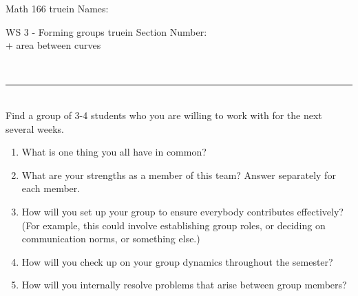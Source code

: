 \documentclass[12pt]{article}
\begin{document}
\pagestyle{empty} %

\noindent
{Math 166    truein  Names:\ \hrulefill}

\noindent
{WS 3 - Forming groups   truein  Section Number:\ \hrulefill\\ + area between curves}

\ 
\hrule\ \\
\noindent
\noindent
\noindent
Find a group of 3-4 students who you are willing to work with for the next several weeks.
\begin{enumerate}
\item What is one thing you all have in common?
\vfill
\item What are your strengths as a member of this team?  Answer separately for each member.
\vfill
\vfill
\item How will you set up your group to ensure everybody contributes effectively?  (For example, this could involve establishing group roles, or deciding on communication norms, or something else.)
\vfill
\item How will you check up on your group dynamics throughout the semester?
\vfill
\item How will you internally resolve problems that arise between group members?
\vfill
\end{enumerate}
\end{document}
